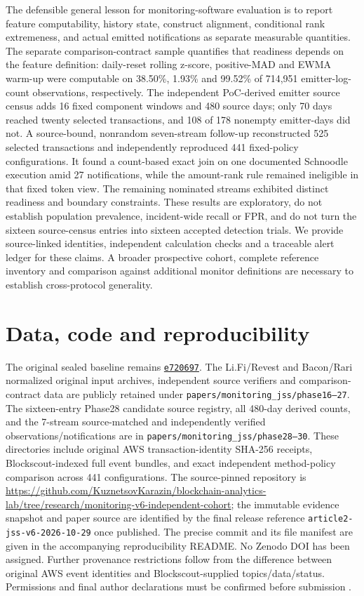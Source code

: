 \documentclass[preprint,12pt,authoryear]{elsarticle}
\begin{document}
The defensible general lesson for monitoring-software evaluation is to report feature computability, history state, construct alignment, conditional rank extremeness, and actual emitted notifications as separate measurable quantities. The separate comparison-contract sample quantifies that readiness depends on the feature definition: daily-reset rolling z-score, positive-MAD and EWMA warm-up were computable on 38.50\%, 1.93\% and 99.52\% of 714,951 emitter-log-count observations, respectively. The independent PoC-derived emitter source census adds 16 fixed component windows and 480 source days; only 70 days reached twenty selected transactions, and 108 of 178 nonempty emitter-days did not. A source-bound, nonrandom seven-stream follow-up reconstructed 525 selected transactions and independently reproduced 441 fixed-policy configurations. It found a count-based exact join on one documented Schnoodle execution amid 27 notifications, while the amount-rank rule remained ineligible in that fixed token view. The remaining nominated streams exhibited distinct readiness and boundary constraints. These results are exploratory, do not establish population prevalence, incident-wide recall or FPR, and do not turn the sixteen source-census entries into sixteen accepted detection trials. We provide source-linked identities, independent calculation checks and a traceable alert ledger for these claims. A broader prospective cohort, complete reference inventory and comparison against additional monitor definitions are necessary to establish cross-protocol generality.

\section*{Data, code and reproducibility}
The original sealed baseline remains \href{https://github.com/KuznetsovKarazin/blockchain-analytics-lab/commit/e720697bc3986dd291a7047c580cf973ae6e5567}{\texttt{e720697}}. The Li.Fi/Revest and Bacon/Rari normalized original input archives, independent source verifiers and comparison-contract data are publicly retained under \texttt{papers/monitoring\_jss/phase16--27}. The sixteen-entry Phase28 candidate source registry, all 480-day derived counts, and the 7-stream source-matched and independently verified observations/notifications are in \texttt{papers/monitoring\_jss/phase28--30}. These directories include original AWS transaction-identity SHA-256 receipts, Blockscout-indexed full event bundles, and exact independent method-policy comparison across 441 configurations. The source-pinned repository is \url{https://github.com/KuznetsovKarazin/blockchain-analytics-lab/tree/research/monitoring-v6-independent-cohort}; the immutable evidence snapshot and paper source are identified by the final release reference \texttt{article2-jss-v6-2026-10-29} once published. The precise commit and its file manifest are given in the accompanying reproducibility README. No Zenodo DOI has been assigned. Further provenance restrictions follow from the difference between original AWS event identities and Blockscout-supplied topics/data/status. Permissions and final author declarations must be confirmed before submission \citep{Kuznetsov2026Artifacts}.
\end{document}
